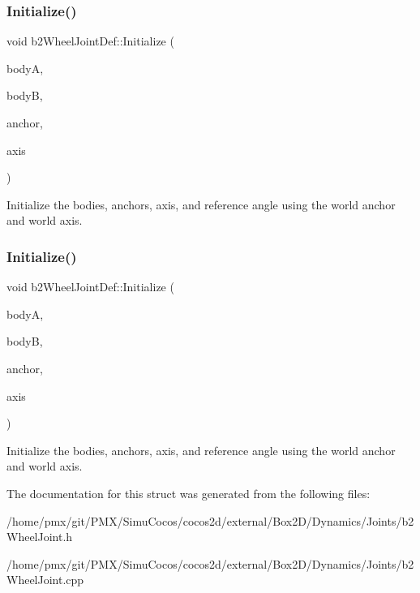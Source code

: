 \subsubsection{\texorpdfstring{Initialize()}{Initialize()}\hspace{0.1cm}{\footnotesize\ttfamily [1/2]}}
{\footnotesize\ttfamily void b2\+Wheel\+Joint\+Def\+::\+Initialize (\begin{DoxyParamCaption}\item[{\hyperlink{classb2Body}{b2\+Body} $\ast$}]{bodyA,  }\item[{\hyperlink{classb2Body}{b2\+Body} $\ast$}]{bodyB,  }\item[{const \hyperlink{structb2Vec2}{b2\+Vec2} \&}]{anchor,  }\item[{const \hyperlink{structb2Vec2}{b2\+Vec2} \&}]{axis }\end{DoxyParamCaption})}

Initialize the bodies, anchors, axis, and reference angle using the world anchor and world axis. \mbox{\label{structb2WheelJointDef_af26887092d36c3cd03898401a38783e2}} 
\subsubsection{\texorpdfstring{Initialize()}{Initialize()}\hspace{0.1cm}{\footnotesize\ttfamily [2/2]}}
{\footnotesize\ttfamily void b2\+Wheel\+Joint\+Def\+::\+Initialize (\begin{DoxyParamCaption}\item[{\hyperlink{classb2Body}{b2\+Body} $\ast$}]{bodyA,  }\item[{\hyperlink{classb2Body}{b2\+Body} $\ast$}]{bodyB,  }\item[{const \hyperlink{structb2Vec2}{b2\+Vec2} \&}]{anchor,  }\item[{const \hyperlink{structb2Vec2}{b2\+Vec2} \&}]{axis }\end{DoxyParamCaption})}

Initialize the bodies, anchors, axis, and reference angle using the world anchor and world axis. 

The documentation for this struct was generated from the following files\+:\begin{DoxyCompactItemize}
\item 
/home/pmx/git/\+P\+M\+X/\+Simu\+Cocos/cocos2d/external/\+Box2\+D/\+Dynamics/\+Joints/b2\+Wheel\+Joint.\+h\item 
/home/pmx/git/\+P\+M\+X/\+Simu\+Cocos/cocos2d/external/\+Box2\+D/\+Dynamics/\+Joints/b2\+Wheel\+Joint.\+cpp\end{DoxyCompactItemize}
